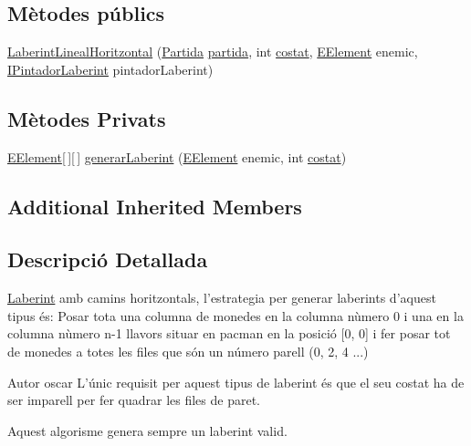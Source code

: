 \subsection*{Mètodes públics}
\begin{DoxyCompactItemize}
\item 
\hyperlink{classlogica_1_1laberints_1_1_laberint_lineal_horitzontal_a3aa38bdd438bdc9db196ae507944e34a}{Laberint\+Lineal\+Horitzontal} (\hyperlink{classlogica_1_1_partida}{Partida} \hyperlink{classlogica_1_1laberints_1_1_laberint_a7183ce070714f73e078bb36e8c21b575}{partida}, int \hyperlink{classlogica_1_1laberints_1_1_laberint_ae874ac4889592b811709f5b967d85286}{costat}, \hyperlink{enumlogica_1_1enumeracions_1_1_e_element}{E\+Element} enemic, \hyperlink{interfaceinterficie_1_1_i_pintador_laberint}{I\+Pintador\+Laberint} pintador\+Laberint)
\end{DoxyCompactItemize}
\subsection*{Mètodes Privats}
\begin{DoxyCompactItemize}
\item 
\hyperlink{enumlogica_1_1enumeracions_1_1_e_element}{E\+Element}\mbox{[}$\,$\mbox{]}\mbox{[}$\,$\mbox{]} \hyperlink{classlogica_1_1laberints_1_1_laberint_lineal_horitzontal_a6f3432d9ea0def617be88ac62c55c787}{generar\+Laberint} (\hyperlink{enumlogica_1_1enumeracions_1_1_e_element}{E\+Element} enemic, int \hyperlink{classlogica_1_1laberints_1_1_laberint_ae874ac4889592b811709f5b967d85286}{costat})
\end{DoxyCompactItemize}
\subsection*{Additional Inherited Members}


\subsection{Descripció Detallada}
\hyperlink{classlogica_1_1laberints_1_1_laberint}{Laberint} amb camins horitzontals, l'estrategia per generar laberints d'aquest tipus és\+: Posar tota una columna de monedes en la columna nùmero 0 i una en la columna nùmero n-\/1 llavors situar en pacman en la posició \mbox{[}0, 0\mbox{]} i fer posar tot de monedes a totes les files que són un número parell (0, 2, 4 ...) 

\begin{DoxyAuthor}{Autor}
oscar L'únic requisit per aquest tipus de laberint és que el seu costat ha de ser imparell per fer quadrar les files de paret.
\end{DoxyAuthor}
Aquest algorisme genera sempre un laberint valid. 


